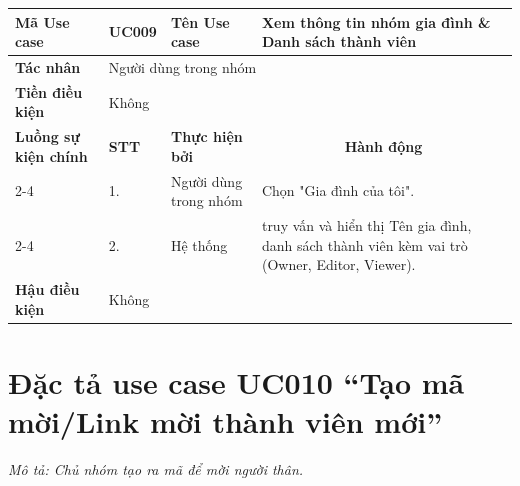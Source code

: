 \begingroup
\renewcommand{\arraystretch}{1.5}

\begin{longtable}{|p{2.7cm}|p{0.8cm}|p{2.6cm}|p{7.3cm}|}
\hline
\cellcolor[HTML]{D5F5E3}\textbf{Mã Use case} & \multicolumn{1}{l|}{UC009} & \cellcolor[HTML]{D5F5E3}\textbf{Tên Use case} & Xem thông tin nhóm gia đình \& Danh sách thành viên \\ \hline
\cellcolor[HTML]{D5F5E3}\textbf{Tác nhân} & \multicolumn{3}{p{10.7cm}|}{Người dùng trong nhóm} \\ \hline
\cellcolor[HTML]{D5F5E3}\textbf{Tiền điều kiện} & \multicolumn{3}{p{10.7cm}|}{Không} \\ \hline

\cellcolor[HTML]{D5F5E3}\textbf{Luồng sự kiện chính} & \cellcolor[HTML]{FDEBD0}\textbf{STT} & \cellcolor[HTML]{FDEBD0}\textbf{Thực hiện bởi} & \multicolumn{1}{c|}{\cellcolor[HTML]{FDEBD0}\textbf{Hành động}} \\ \cline{2-4} 
\cellcolor[HTML]{D5F5E3} & 1. & Người dùng trong nhóm & Chọn "Gia đình của tôi". \\ \cline{2-4} 
\cellcolor[HTML]{D5F5E3} & 2. & Hệ thống & truy vấn và hiển thị Tên gia đình, danh sách thành viên kèm vai trò (Owner, Editor, Viewer). \\ \hline

\cellcolor[HTML]{D5F5E3}\textbf{Hậu điều kiện} & \multicolumn{3}{p{10.7cm}|}{Không} \\ \hline
\end{longtable}
\endgroup

\section{Đặc tả use case UC010 ``Tạo mã mời/Link mời thành viên mới''}
\textit{Mô tả: Chủ nhóm tạo ra mã để mời người thân.}
\vspace{0.5cm}

\begingroup
\renewcommand{\arraystretch}{1.5}

